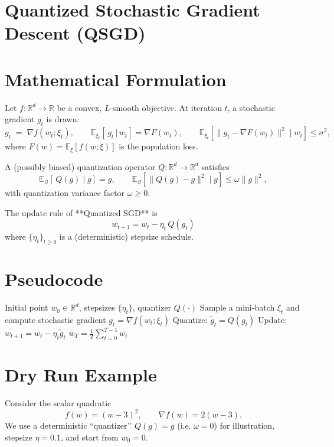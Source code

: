 \documentclass{article}
\newcommand{\EE}{\mathbb{E}}
\newcommand{\RR}{\mathbb{R}}
\begin{document}
\section*{Quantized Stochastic Gradient Descent (QSGD)}

\section*{Mathematical Formulation}
Let $f:\RR^{d}\to\RR$ be a convex, $L$‑smooth objective.  
At iteration $t$, a stochastic gradient $g_t$ is drawn:
\[
g_t \;=\; \nabla f(w_t;\xi_t),\qquad 
\EE_{\xi_t}[\,g_t\,|\,w_t]=\nabla F(w_t),\qquad 
\EE_{\xi_t}\!\left[\|g_t-\nabla F(w_t)\|^{2}\mid w_t\right]\le\sigma^{2},
\]
where $F(w)=\EE_{\xi}[f(w;\xi)]$ is the population loss.

A (possibly biased) quantization operator $Q:\RR^{d}\to\RR^{d}$ satisfies
\[
\EE_{\mathcal{Q}}[\,Q(g)\mid g]=g,\qquad 
\EE_{\mathcal{Q}}\!\left[\|Q(g)-g\|^{2}\mid g\right]\le \omega\|g\|^{2},
\tag{1}
\]
with quantization variance factor $\omega\ge0$.

The update rule of **Quantized SGD** is
\[
\boxed{ \; w_{t+1}= w_t - \eta_t\, Q(g_t)\; } \tag{2}
\]
where $\{\eta_t\}_{t\ge0}$ is a (deterministic) stepsize schedule.

\section*{Pseudocode}
\begin{algorithm}[H]
\caption{Quantized Stochastic Gradient Descent}
\begin{algorithmic}[1]
\Require Initial point $w_{0}\in\RR^{d}$, stepsizes $\{\eta_t\}$, quantizer $Q(\cdot)$
    \State Sample a mini‑batch $\xi_t$ and compute stochastic gradient $g_t=\nabla f(w_t;\xi_t)$
    \State Quantize: $\tilde g_t = Q(g_t)$
    \State Update: $w_{t+1}= w_t - \eta_t \tilde g_t$
\EndFor
\State \Return $ \displaystyle \bar w_T=\frac1T\sum_{t=0}^{T-1} w_t$
\end{algorithmic}
\end{algorithm}

\section*{Dry Run Example}
Consider the scalar quadratic
\[
f(w)=(w-3)^{2},\qquad \nabla f(w)=2(w-3).
\]
We use a deterministic “quantizer’’ $Q(g)=g$ (i.e. $\omega=0$) for illustration,
stepsize $\eta=0.1$, and start from $w_{0}=0$.
\end{document}
